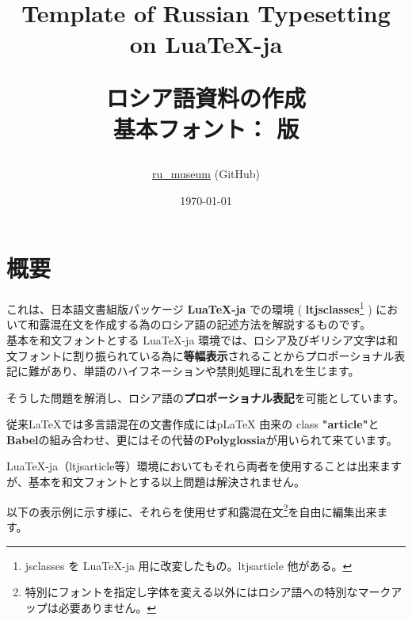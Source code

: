 \documentclass[a4paper,10pt]{ltjsarticle}
\title{
  \huge Template of Russian Typesetting\\ on LuaTeX-ja\vspace{16mm} \par
  \Large{ロシア語資料の作成}\vspace{6mm}\\
  \small{基本フォント： \myMainfont 版}
\par\vspace{120mm}
}
\author{\href{https://github.com/ru-museum/}{ru\_museum} (GitHub)}
\date{\today}
\def\colH#1{\color[HTML]{#1}}
\begin{document}
\maketitle

\thispagestyle{empty}
\clearpage

\newpage

{\makeatletter
\let\ps@jpl@in\ps@empty
\makeatother
\pagestyle{empty}
\tableofcontents
\clearpage}

  

\newpage
\addtocounter{page}{-3}

\section{概要}
これは、日本語文書組版パッケージ \textbf{\colH{800000} LuaTeX-ja} での環境 ( \textbf{\colH{800000} ltjsclasses}\footnote{jsclasses を LuaTeX-ja 用に改変したもの。ltjsarticle 他がある。} ) において和露混在文を作成する為のロシア語の記述方法を解説するものです。\vspace{6pt}\\
基本を和文フォントとする LuaTeX-ja 環境では、ロシア及びギリシア文字は和文フォントに割り振られている為に\textbf{等幅表示}されることからプロポーショナル表記に難があり、単語のハイフネーションや禁則処理に乱れを生じます。\vspace{6pt}\par

そうした問題を解消し、ロシア語の\textbf{プロポーショナル表記}を可能としています。\vspace{6pt}\par

従来LaTeX{}では多言語混在の文書作成にはp\LaTeX{} 由来の class \textbf{"article"}と\textbf{Babel}の組み合わせ、更にはその代替の\textbf{Polyglossia}が用いられて来ています。\vspace{6pt}\par

LuaTeX-ja（ltjsarticle等）環境においてもそれら両者を使用することは出来ますが、基本を和文フォントとする以上問題は解決されません。\vspace{6pt}\par

以下の表示例に示す様に、それらを使用せず和露混在文\footnote{特別にフォントを指定し字体を変える以外にはロシア語への特別なマークアップは必要ありません。}を自由に編集出来ます。\vspace{-2mm}\par
\end{document}
